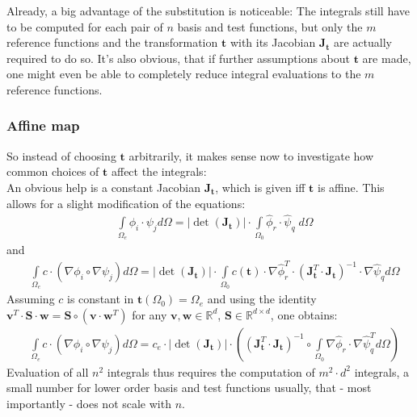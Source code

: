 \documentclass{IOS-Book-Article}
\theoremstyle{plain}
\theoremstyle{definition}
\begin{document}
Already, a big advantage of the substitution is noticeable: The integrals still have to be computed for each pair of $n$ basis and test functions, but only the $m$ reference functions and the transformation $\mathbf t$ with its Jacobian $\mathbf J_{\mathbf t}$ are actually required to do so. It's also obvious, that if further assumptions about $\mathbf t$ are made, one might even be able to completely reduce integral evaluations to the $m$ reference functions.

\subsubsection{Affine map}

So instead of choosing $\mathbf t$ arbitrarily, it makes sense now to investigate how common choices of $\mathbf t$ affect the integrals: \\
An obvious help is a constant Jacobian $\mathbf J_{\mathbf t}$, which is given iff $\mathbf t$ is affine. 
This allows for a slight modification of the equations:
\begin{align*}
	& \int \limits_{\Omega_e} \phi_i \cdot \psi_j d\Omega = \left| \det(\mathbf J_{\mathbf t}) \right| \cdot \int \limits_{\Omega_0} \hat \phi_r \cdot \hat \psi_q \; d\Omega
\end{align*}
and
\begin{align*}
	& \int \limits_{\Omega_e} c \cdot (\nabla \phi_i \circ \nabla \psi_j) d\Omega = \left| \det(\mathbf J_{\mathbf t}) \right| \cdot \int \limits_{\Omega_0} c( \mathbf t ) \cdot \nabla \hat \phi_r^T \cdot (\mathbf J_{\mathbf{t}}^T \cdot \mathbf J_{\mathbf{t}})^{-1} \cdot \nabla \hat \psi_q d\Omega
\end{align*}
Assuming $c$ is constant in $\mathbf t(\Omega_0) = \Omega_e$ and using the identity $\mathbf v^T \cdot \mathbf S \cdot \mathbf w = \mathbf S \circ (\mathbf v \cdot \mathbf w^T)$ for any $\mathbf v, \mathbf w \in \mathbb R^d$, $\mathbf S \in \mathbb R^{d \times d}$, one obtains:
\begin{align*}
	& \int \limits_{\Omega_e} c \cdot (\nabla \phi_i \circ \nabla \psi_j) d\Omega = c_e \cdot \left| \det(\mathbf J_{\mathbf t}) \right| \cdot \left( (\mathbf J_{\mathbf{t}}^T \cdot \mathbf J_{\mathbf{t}})^{-1} \circ \int \limits_{\Omega_0} \nabla \hat \phi_r \cdot \nabla \hat \psi_q^T d\Omega \right)
\end{align*}
Evaluation of all $n^2$ integrals thus requires the computation of $m^2 \cdot d^2$ integrals, a small number for lower order basis and test functions usually, that - most importantly - does not scale with $n$.
\end{document}
